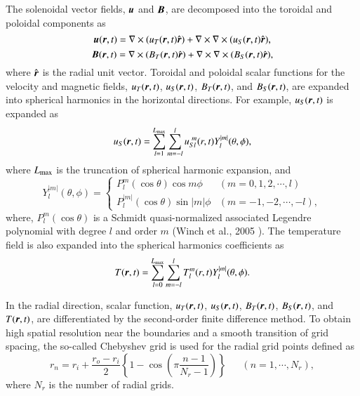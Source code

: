 %
The solenoidal vector fields, $\mbox{\boldmath$u$}$ and $\mbox{\boldmath$B$}$, are decomposed into the toroidal and poloidal components as
%
\begin{equation}
    \mbox{\boldmath$u$} (\mbox{\boldmath$r$}, t) = \nabla \times ( u_T (\mbox{\boldmath$r$}, t) \hat{\mbox{\boldmath$r$}} ) + \nabla \times \nabla \times ( u_S (\mbox{\boldmath$r$}, t) \hat{\mbox{\boldmath$r$}} ),
\label{eq:uT_uS}
\end{equation}
%
\begin{equation}
    \mbox{\boldmath$B$} (\mbox{\boldmath$r$}, t) = \nabla \times ( B_T (\mbox{\boldmath$r$}, t) \hat{\mbox{\boldmath$r$}} ) + \nabla \times \nabla \times ( B_S (\mbox{\boldmath$r$}, t) \hat{\mbox{\boldmath$r$}} ),
\label{eq:BT_BS}
\end{equation}
where %
$\hat{\mbox{\boldmath$r$}}$ is the radial unit vector.
Toroidal and poloidal scalar functions for the velocity and magnetic fields, $u_T (\mbox{\boldmath$r$}, t)$, $u_S (\mbox{\boldmath$r$}, t)$, $B_T (\mbox{\boldmath$r$}, t)$, and $B_S (\mbox{\boldmath$r$}, t)$, 
are expanded into spherical harmonics in the horizontal directions. For example, $u_{S} (\mbox{\boldmath$r$}, t)$ is expanded as
%
\begin{equation}
    u_{S} (\mbox{\boldmath$r$}, t) = \sum_{l=1}^{L_{\rm max}} \sum_{m=-l}^{l} u_{Sl}^{\ m} (r, t) Y_l^{|m|} (\theta, \phi),
\label{eq:Us_expansion}
\end{equation}
%
where $L_{\rm max}$ is the truncation of spherical harmonic expansion, and
%
\begin{equation}
Y_l^{|m|} (\theta, \phi) = \left\{
 \begin{array}{ll}
 P_l^m(\cos\theta)\cos m\phi & (m = 0, 1, 2, \cdots, l)
 \\
 P_l^{|m|}(\cos\theta)\sin |m|\phi & (m = -1, -2, \cdots, -l) ,
 \end{array}
\right.
\label{eq:def_of_Ylm}
\end{equation}
%
where, $P_l^m (\cos \theta )$ is a Schmidt quasi-normalized associated Legendre polynomial with degree $l$ and order $m$ (Winch et al., 2005 \cite{Winch:2005}).
The temperature field is also expanded into the spherical harmonics coefficients as 
%
\begin{equation}
    T(\mbox{\boldmath$r$}, t) = \sum_{l=0}^{L_{\rm max}} \sum_{m=-l}^{l} T_l^m (r, t) Y_l^{|m|} (\theta, \phi).
\label{eq:T_expansion}
\end{equation}
%

In the radial direction, scalar function, $u_T (\mbox{\boldmath$r$}, t)$, $u_S (\mbox{\boldmath$r$}, t)$, $B_T (\mbox{\boldmath$r$}, t)$, $B_S (\mbox{\boldmath$r$}, t)$, and $T(\mbox{\boldmath$r$}, t)$, are differentiated by the second-order finite difference method. 
To obtain high spatial resolution near the boundaries and a smooth transition of grid spacing, the so-called Chebyshev grid is used for the radial grid points defined as
%
\begin{equation}
r_n = r_i + \frac{r_o - r_i}{2} \left\{ 1 - \cos \left( \pi \frac{n-1}{N_r-1} \right) \right\} ~~\;\;\;\; (n = 1, \cdots , N_r) ,
\label{eq:def_of_rn}
\end{equation}
%
where $N_r$ is the number of radial grids.

